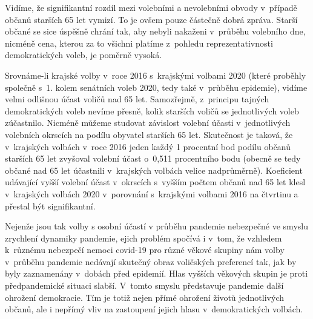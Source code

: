 Vidíme, že signifikantní rozdíl mezi volebními a nevolebními obvody v~případě občanů starších 65 let vymizí. To je ovšem pouze částečně dobrá zpráva. Starší občané se sice úspěšně chrání tak, aby nebyli nakaženi v~průběhu volebního dne, nicméně cena, kterou za to všichni platíme z~pohledu reprezentativnosti demokratických voleb, je poměrně vysoká. 

Srovnáme-li krajské volby v~roce 2016 s~krajskými volbami 2020 (které proběhly společně s~1. kolem senátních voleb 2020, tedy také v~průběhu epidemie), vidíme velmi odlišnou účast voličů nad 65 let. Samozřejmě, z~principu tajných demokratických voleb nevíme přesně, kolik starších voličů se jednotlivých voleb zúčastnilo. Nicméně můžeme studovat závislost volební účasti v~jednotlivých volebních okrscích na podílu obyvatel starších 65 let. Skutečnost je taková, že v~krajských volbách v~roce 2016 jeden každý 1 procentní bod podílu občanů starších 65 let zvyšoval volební účast o~0,511 procentního bodu (obecně se tedy občané nad 65 let účastnili v~krajských volbách velice nadprůměrně). Koeficient udávající vyšší volební účast v~okrscích s~vyšším počtem občanů nad 65 let klesl v~krajských volbách 2020 v~porovnání s~krajskými volbami 2016 na čtvrtinu a přestal být signifikantní.

Nejenže jsou tak volby s osobní účastí v průběhu pandemie nebezpečné ve smyslu zrychlení dynamiky pandemie, ejich problém spočívá i v~tom, že vzhledem k~růz\-né\-mu nebezpečí nemoci covid-19 pro různé věkové skupiny nám volby v~průběhu pandemie nedávají skutečný obraz voličských preferencí tak, jak by byly zaznamenány v~dobách před epidemií. Hlas vyšších věkových skupin je proti předpandemické situaci slabší. V~tomto smyslu představuje pandemie další ohrožení demokracie. Tím je totiž nejen přímé ohrožení životů jednotlivých občanů, ale i nepřímý vliv na zastoupení jejich hlasu v~demokratických volbách.

